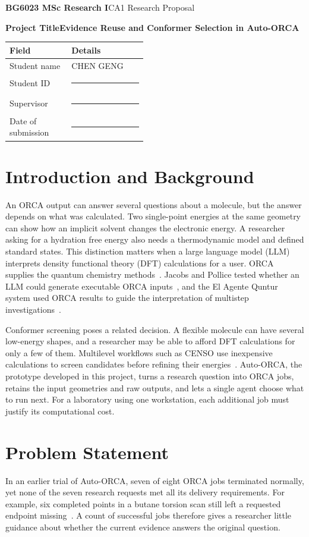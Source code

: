\documentclass[12pt,a4paper]{article}
\newcommand{\blankfield}{\rule{3.5cm}{0.35pt}}
\newcommand{\StudentName}{CHEN GENG}
\newcommand{\StudentID}{\blankfield}
\newcommand{\Supervisor}{\blankfield}
\newcommand{\SubmissionDate}{\blankfield} %
\begin{document}
\textbf{BG6023 MSc Research I}\hfill CA1 Research Proposal\par
\vspace{0.25em}
{\fontsize{12}{15}\selectfont\bfseries
Project Title\quad Evidence Reuse and Conformer Selection in Auto-ORCA\par}
\begin{tabularx}{\linewidth}{|p{0.456\linewidth}|Y|}
\hline
{}\textbf{Field} & \textbf{Details} \\ \hline
Student name & \StudentName \\ \hline
Student ID & \StudentID \\ \hline
Supervisor & \Supervisor \\ \hline
Date of submission & \SubmissionDate \\ \hline
\end{tabularx}

\section{Introduction and Background}
An ORCA output can answer several questions about a molecule, but the answer
depends on what was calculated. Two single-point energies at the same geometry
can show how an implicit solvent changes the electronic energy. A researcher
asking for a hydration free energy also needs a thermodynamic model and defined
standard states. This distinction matters when a large language model (LLM)
interprets density functional theory (DFT) calculations for a user.
ORCA supplies the quantum chemistry methods~\cite{neese}. Jacobs and Pollice
tested whether an LLM could generate executable ORCA inputs~\cite{jacobs},
and the El Agente Quntur system used ORCA results to guide the interpretation
of multistep investigations~\cite{quntur}.

Conformer screening poses a related decision. A flexible molecule can have
several low-energy shapes, and a researcher may be able to afford DFT
calculations for only a few of them. Multilevel workflows such as CENSO use
inexpensive calculations to screen candidates before refining their
energies~\cite{censo}. Auto-ORCA, the prototype developed in this project,
turns a research question into ORCA jobs, retains the input geometries and
raw outputs, and lets a single agent choose what to run next. For a laboratory
using one workstation, each additional job must justify its computational cost.

\section{Problem Statement}
In an earlier trial of Auto-ORCA, seven of eight ORCA jobs terminated normally,
yet none of the seven research requests met all its delivery requirements.
For example, six completed points in a butane torsion scan still left a
requested endpoint missing~\cite{trial}. A count of successful jobs therefore
gives a researcher little guidance about whether the current evidence answers
the original question.
\end{document}
